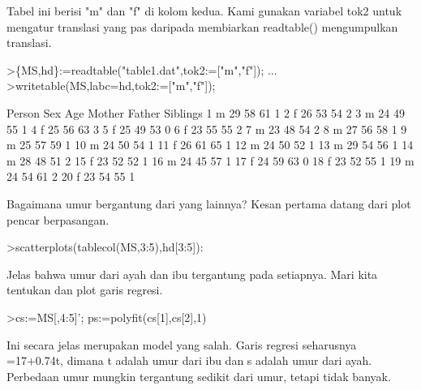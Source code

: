 \documentclass[a4paper,10pt]{article}
\begin{document}
\begin{eulernotebook}
\begin{eulercomment}
Tabel ini berisi "m" dan "f" di kolom kedua. Kami gunakan variabel
tok2 untuk mengatur translasi yang pas daripada membiarkan readtable()
mengumpulkan translasi.
\end{eulercomment}
\begin{eulerprompt}
>\{MS,hd\}:=readtable("table1.dat",tok2:=["m","f"]);  ...
>writetable(MS,labc=hd,tok2:=["m","f"]);
\end{eulerprompt}
\begin{euleroutput}
      Person       Sex       Age    Mother    Father  Siblings
           1         m        29        58        61         1
           2         f        26        53        54         2
           3         m        24        49        55         1
           4         f        25        56        63         3
           5         f        25        49        53         0
           6         f        23        55        55         2
           7         m        23        48        54         2
           8         m        27        56        58         1
           9         m        25        57        59         1
          10         m        24        50        54         1
          11         f        26        61        65         1
          12         m        24        50        52         1
          13         m        29        54        56         1
          14         m        28        48        51         2
          15         f        23        52        52         1
          16         m        24        45        57         1
          17         f        24        59        63         0
          18         f        23        52        55         1
          19         m        24        54        61         2
          20         f        23        54        55         1
\end{euleroutput}
\begin{eulercomment}
Bagaimana umur bergantung dari yang lainnya? Kesan pertama datang dari
plot pencar berpasangan.
\end{eulercomment}
\begin{eulerprompt}
>scatterplots(tablecol(MS,3:5),hd[3:5]):
\end{eulerprompt}
\begin{eulercomment}
Jelas bahwa umur dari ayah dan ibu tergantung pada setiapnya. Mari
kita tentukan dan plot garis regresi.
\end{eulercomment}
\begin{eulerprompt}
>cs:=MS[,4:5]'; ps:=polyfit(cs[1],cs[2],1)
\end{eulerprompt}
\begin{euleroutput}
  [17.3789,  0.740964]
\end{euleroutput}
\begin{eulercomment}
Ini secara jelas merupakan model yang salah. Garis regresi seharusnya
=17+0.74t, dimana t adalah umur dari ibu dan s adalah umur dari ayah.
Perbedaan umur mungkin tergantung sedikit dari umur, tetapi tidak
banyak.


\end{eulercomment}
\end{eulernotebook}
\end{document}

